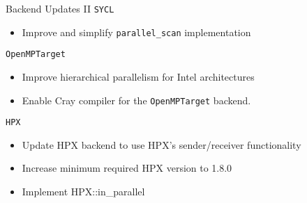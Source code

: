 \begin{frame}[fragile]{Backend Updates II}
\texttt{SYCL}
\begin{itemize}
   \item Improve and simplify \texttt{parallel\_scan} implementation
\end{itemize}
\vfill
\texttt{OpenMPTarget}
\begin{itemize}
   \item Improve hierarchical parallelism for Intel architectures
   \item Enable Cray compiler for the \texttt{OpenMPTarget} backend.
\end{itemize}
\vfill
\texttt{HPX}
\begin{itemize}
    \item Update HPX backend to use HPX's sender/receiver functionality
    \item Increase minimum required HPX version to 1.8.0
    \item Implement HPX::in\_parallel
\end{itemize}
\end{frame}


